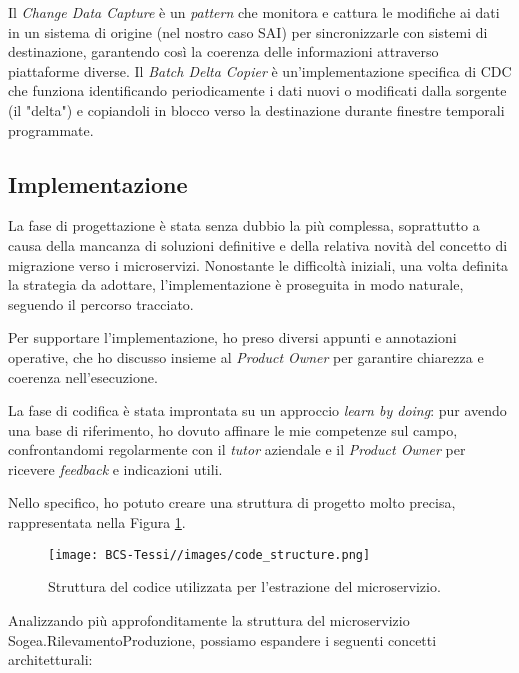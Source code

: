         
        \vspace{0.2 em} 
        \noindent Il \textit{Change Data Capture} è un \textit{pattern} che monitora e cattura le modifiche ai dati in un sistema di origine (nel nostro caso SAI) per sincronizzarle con sistemi di destinazione, garantendo così la coerenza delle informazioni attraverso piattaforme diverse. Il \textit{Batch Delta Copier} è un'implementazione specifica di CDC che funziona identificando periodicamente i dati nuovi o modificati dalla sorgente (il "delta") e copiandoli in blocco verso la destinazione durante finestre temporali programmate.


        
        \subsection{Implementazione}
        La fase di progettazione è stata senza dubbio la più complessa, soprattutto a causa della mancanza di soluzioni definitive e della relativa novità del concetto di migrazione verso i microservizi. Nonostante le difficoltà iniziali, una volta definita la strategia da adottare, l’implementazione è proseguita in modo naturale, seguendo il percorso tracciato.  

        Per supportare l’implementazione, ho preso diversi appunti e annotazioni operative, che ho discusso insieme al \textit{Product Owner} per garantire chiarezza e coerenza nell’esecuzione.  

        La fase di codifica è stata improntata su un approccio \textit{learn by doing}: pur avendo una base di riferimento, ho dovuto affinare le mie competenze sul campo, confrontandomi regolarmente con il \textit{tutor} aziendale e il \textit{Product Owner} per ricevere \textit{feedback} e indicazioni utili.

        Nello specifico, ho potuto creare una struttura di progetto molto precisa, rappresentata nella Figura \ref{fig:code-structure}.

         
        \begin{figure}[H]
            \centering
            \texttt{[image: BCS-Tessi//images/code\_structure.png]}
            \caption{Struttura del codice utilizzata per l'estrazione del microservizio.}
            \label{fig:code-structure}
        \end{figure}

        
        Analizzando più approfonditamente la struttura del microservizio Sogea.RilevamentoProduzione, possiamo espandere i seguenti concetti architetturali:

